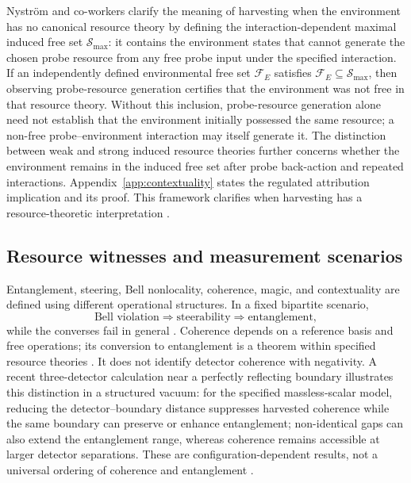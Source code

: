 \documentclass[pdflatex,sn-mathphys-num]{sn-jnl}
\begin{document}
Nyström and co-workers clarify the meaning of harvesting when the environment has no canonical resource theory by defining the interaction-dependent maximal induced free set $\mathcal S_{\max}$: it contains the environment states that cannot generate the chosen probe resource from any free probe input under the specified interaction. If an independently defined environmental free set $\mathcal F_E$ satisfies $\mathcal F_E\subseteq\mathcal S_{\max}$, then observing probe-resource generation certifies that the environment was not free in that resource theory. Without this inclusion, probe-resource generation alone need not establish that the environment initially possessed the same resource; a non-free probe--environment interaction may itself generate it. The distinction between weak and strong induced resource theories further concerns whether the environment remains in the induced free set after probe back-action and repeated interactions. Appendix~\ref{app:contextuality} states the regulated attribution implication and its proof. This framework clarifies when harvesting has a resource-theoretic interpretation \cite{Nystrom2026Induced}.

\subsection{Resource witnesses and measurement scenarios}
Entanglement, steering, Bell nonlocality, coherence, magic, and contextuality are defined using different operational structures. In a fixed bipartite scenario,
\begin{equation}
\text{Bell violation}\Longrightarrow\text{steerability}\Longrightarrow\text{entanglement},
\label{eq:resource-implication-chain}
\end{equation}
while the converses fail in general \cite{Bell1964,ClauserHorneShimonyHolt1969,WisemanJonesDoherty2007,Uola2020}. Coherence depends on a reference basis and free operations; its conversion to entanglement is a theorem within specified resource theories \cite{BaumgratzCramerPlenio2014,WinterYang2016,Streltsov2015,StreltsovAdessoPlenio2017}. It does not identify detector coherence with negativity. A recent three-detector calculation near a perfectly reflecting boundary illustrates this distinction in a structured vacuum: for the specified massless-scalar model, reducing the detector--boundary distance suppresses harvested coherence while the same boundary can preserve or enhance entanglement; non-identical gaps can also extend the entanglement range, whereas coherence remains accessible at larger detector separations. These are configuration-dependent results, not a universal ordering of coherence and entanglement \cite{WuReflectingBoundary2026}.
\end{document}
